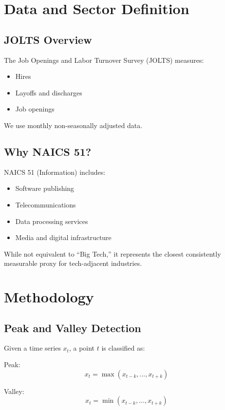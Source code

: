 \documentclass[conference]{IEEEtran}
\begin{document}
\section{Data and Sector Definition}

\subsection{JOLTS Overview}

The Job Openings and Labor Turnover Survey (JOLTS) measures:
\begin{itemize}
\item Hires
\item Layoffs and discharges
\item Job openings
\end{itemize}

We use monthly non-seasonally adjusted data.

\subsection{Why NAICS 51?}

NAICS 51 (Information) includes:
\begin{itemize}
\item Software publishing
\item Telecommunications
\item Data processing services
\item Media and digital infrastructure
\end{itemize}

While not equivalent to “Big Tech,” it represents the closest consistently measurable proxy for tech-adjacent industries.

\section{Methodology}

\subsection{Peak and Valley Detection}

Given a time series $x_t$, a point $t$ is classified as:

Peak:
\[
x_t = \max(x_{t-k}, ..., x_{t+k})
\]

Valley:
\[
x_t = \min(x_{t-k}, ..., x_{t+k})
\]
\end{document}
